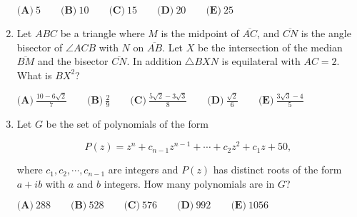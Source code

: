 \documentclass{article}
\begin{document}
\begin{enumerate}[label=\arabic*., itemsep=0.5em]
\( \textbf{(A)}\ 5\qquad\textbf{(B)}\ 10\qquad\textbf{(C)}\ 15\qquad\textbf{(D)}\ 20\qquad\textbf{(E)}\ 25 \)\par \vspace{0.5em}\item Let \(ABC\) be a triangle where \(M\) is the midpoint of \(\overline{AC}\), and \(\overline{CN}\) is the angle bisector of \(\angle{ACB}\) with \(N\) on \(\overline{AB}\). Let \(X\) be the intersection of the median \(\overline{BM}\) and the bisector \(\overline{CN}\). In addition \(\triangle BXN\) is equilateral with \(AC=2\). What is \(BX^2\)?

\(\textbf{(A)}\  \frac{10-6\sqrt{2}}{7} \qquad \textbf{(B)}\ \frac{2}{9} \qquad \textbf{(C)}\ \frac{5\sqrt{2}-3\sqrt{3}}{8} \qquad \textbf{(D)}\ \frac{\sqrt{2}}{6} \qquad \textbf{(E)}\ \frac{3\sqrt{3}-4}{5}\)\par \vspace{0.5em}\item Let \(G\) be the set of polynomials of the form

\begin{equation*}
P(z)=z^n+c_{n-1}z^{n-1}+\cdots+c_2z^2+c_1z+50,
\end{equation*}

where \( c_1,c_2,\cdots, c_{n-1} \) are integers and \(P(z)\) has distinct roots of the form \(a+ib\) with \(a\) and \(b\) integers. How many polynomials are in \(G\)?

\( \textbf{(A)}\ 288\qquad\textbf{(B)}\ 528\qquad\textbf{(C)}\ 576\qquad\textbf{(D)}\ 992\qquad\textbf{(E)}\ 1056 \)\par \vspace{0.5em}\end{enumerate}
\end{document}
